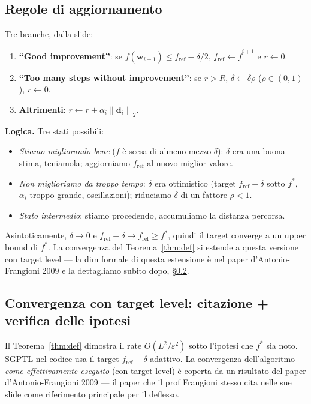 \documentclass[11pt,a4paper]{article}
\newcommand{\norm}[1]{\left\|#1\right\|}
\newcommand{\bw}{\mathbf{w}}
\newcommand{\bd}{\mathbf{d}}
\theoremstyle{definition}
\begin{document}
\subsection{Regole di aggiornamento}

Tre branche, dalla slide:
\begin{enumerate}[leftmargin=*]
\item \textbf{``Good improvement''}: se $f(\bw_{i+1}) \le f_{\mathrm{ref}} - \delta/2$, $f_{\mathrm{ref}}\gets \bar f^{i+1}$ e $r\gets 0$.
\item \textbf{``Too many steps without improvement''}: se $r > R$, $\delta\gets\delta\rho$ ($\rho\in(0,1)$), $r\gets 0$.
\item \textbf{Altrimenti}: $r\gets r + \alpha_i\norm{\bd_i}_2$.
\end{enumerate}

\begin{tcolorbox}[intuition]
\textbf{Logica.} Tre stati possibili:
\begin{itemize}[leftmargin=*]
\item \emph{Stiamo migliorando bene} ($f$ è scesa di almeno mezzo $\delta$): $\delta$ era una buona stima, teniamola; aggiorniamo $f_{\mathrm{ref}}$ al nuovo miglior valore.
\item \emph{Non miglioriamo da troppo tempo}: $\delta$ era ottimistico (target $f_{\mathrm{ref}}-\delta$ sotto $f^*$, $\alpha_i$ troppo grande, oscillazioni); riduciamo $\delta$ di un fattore $\rho<1$.
\item \emph{Stato intermedio}: stiamo procedendo, accumuliamo la distanza percorsa.
\end{itemize}
Asintoticamente, $\delta\to 0$ e $f_{\mathrm{ref}}-\delta\to f_{\mathrm{ref}}\ge f^*$, quindi il target converge a un upper bound di $f^*$. La convergenza del Teorema~\ref{thm:def} si estende a questa versione con target level — la dim formale di questa estensione è nel paper d'Antonio-Frangioni 2009 e la dettagliamo subito dopo, §\ref{sec:tl-convergence}.
\end{tcolorbox}

\subsection{Convergenza con target level: citazione + verifica delle ipotesi}
\label{sec:tl-convergence}

Il Teorema~\ref{thm:def} dimostra il rate $O(L^2/\varepsilon^2)$ sotto l'ipotesi che $f^*$ sia noto. SGPTL nel codice usa il target $f_{\mathrm{ref}}-\delta$ adattivo. La convergenza dell'algoritmo \emph{come effettivamente eseguito} (con target level) è coperta da un risultato del paper d'Antonio-Frangioni 2009 — il paper che il prof Frangioni stesso cita nelle sue slide come riferimento principale per il deflesso.
\end{document}
